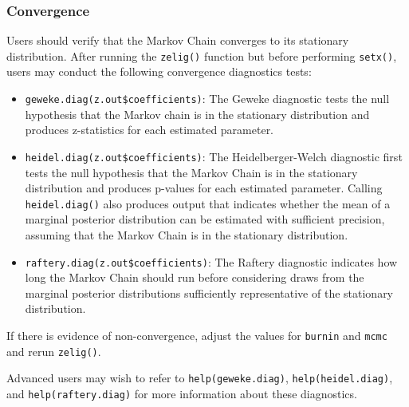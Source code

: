 \subsubsection{Convergence}

Users should verify that the Markov Chain converges to its stationary 
distribution.  After running the \texttt{zelig()} function but before 
performing \texttt{setx()}, users may conduct the following 
convergence diagnostics tests:

\begin{itemize}
\item \texttt{geweke.diag(z.out\$coefficients)}: The Geweke diagnostic tests
the null hypothesis that the Markov chain is in the stationary distribution
and produces z-statistics for each estimated parameter. 
 
\item \texttt{heidel.diag(z.out\$coefficients)}: The Heidelberger-Welch
diagnostic first tests the null hypothesis that the Markov Chain is in the
stationary distribution and produces p-values for each estimated parameter. 
 Calling \texttt{heidel.diag()} also produces
output that indicates whether the mean of a marginal posterior distribution
can be estimated with sufficient precision, assuming that the Markov Chain is
in the stationary distribution.

\item \texttt{raftery.diag(z.out\$coefficients)}: The Raftery diagnostic
indicates how long the Markov Chain should run before considering draws from
the marginal posterior distributions sufficiently representative of the
stationary distribution.
\end{itemize}

\noindent If there is evidence of non-convergence, adjust the values 
for \texttt{burnin} and \texttt{mcmc} and rerun \texttt{zelig()}.

Advanced users may wish to refer to \texttt{help(geweke.diag)}, 
\texttt{help(heidel.diag)}, and \texttt{help(raftery.diag)} for more 
information about these diagnostics. 
